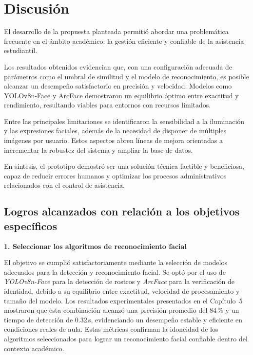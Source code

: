 \fancyhead{}
\fancyfoot{}
\cfoot{\thepage}


\chapter{Discusión}

El desarrollo de la propuesta planteada permitió abordar una problemática frecuente en el ámbito académico: la gestión eficiente y confiable de la asistencia estudiantil.

Los resultados obtenidos evidencian que, con una configuración adecuada de parámetros como el umbral de similitud y el modelo de reconocimiento, es posible alcanzar un desempeño satisfactorio en precisión y velocidad. Modelos como YOLOv8n-Face y ArcFace demostraron un equilibrio óptimo entre exactitud y rendimiento, resultando viables para entornos con recursos limitados.

Entre las principales limitaciones se identificaron la sensibilidad a la iluminación y las expresiones faciales, además de la necesidad de disponer de múltiples imágenes por usuario. Estos aspectos abren líneas de mejora orientadas a incrementar la robustez del sistema y ampliar la base de datos.

En síntesis, el prototipo demostró ser una solución técnica factible y beneficiosa, capaz de reducir errores humanos y optimizar los procesos administrativos relacionados con el control de asistencia.


\section{Logros alcanzados con relación a los objetivos específicos}

\textbf{1. Seleccionar los algoritmos de reconocimiento facial}

El objetivo se cumplió satisfactoriamente mediante la selección de modelos adecuados para la detección y reconocimiento facial. Se optó por el uso de \textit{YOLOv8n-Face} para la detección de rostros y \textit{ArcFace} para la verificación de identidad, debido a su equilibrio entre exactitud, velocidad de procesamiento y tamaño del modelo.  
Los resultados experimentales presentados en el Capítulo~5 mostraron que esta combinación alcanzó una precisión promedio del 84\,\% y un tiempo de detección de 0.32\,s, evidenciando un desempeño estable y eficiente en condiciones reales de aula. Estas métricas confirman la idoneidad de los algoritmos seleccionados para lograr un reconocimiento facial confiable dentro del contexto académico.

